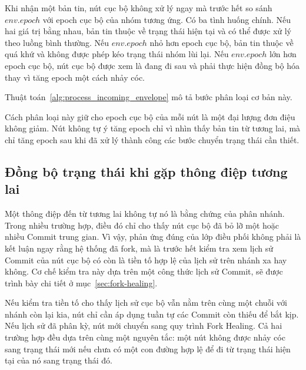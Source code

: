 \documentclass[../DoAn.tex]{subfiles}
\begin{document}
Khi nhận một bản tin, nút cục bộ không xử lý ngay mà trước hết so sánh $env.epoch$ với epoch cục bộ của nhóm tương ứng. Có ba tình huống chính. Nếu hai giá trị bằng nhau, bản tin thuộc về trạng thái hiện tại và có thể được xử lý theo luồng bình thường. Nếu $env.epoch$ nhỏ hơn epoch cục bộ, bản tin thuộc về quá khứ và không được phép kéo trạng thái nhóm lùi lại. Nếu $env.epoch$ lớn hơn epoch cục bộ, nút cục bộ được xem là đang đi sau và phải thực hiện đồng bộ hóa thay vì tăng epoch một cách nhảy cóc.

Thuật toán~\ref{alg:process_incoming_envelope} mô tả bước phân loại cơ bản này.

\begin{algorithm}[htbp]
\SetAlgoLined
{}
\BlankLine
{}
\caption{Phân loại bản tin theo epoch ($ProcessIncomingEnvelope$)}
\label{alg:process_incoming_envelope}
\end{algorithm}

Cách phân loại này giữ cho epoch cục bộ của mỗi nút là một đại lượng đơn điệu không giảm. Nút không tự ý tăng epoch chỉ vì nhìn thấy bản tin từ tương lai, mà chỉ tăng epoch sau khi đã xử lý thành công các bước chuyển trạng thái cần thiết.

\subsection{Đồng bộ trạng thái khi gặp thông điệp tương lai}

Một thông điệp đến từ tương lai không tự nó là bằng chứng của phân nhánh. Trong nhiều trường hợp, điều đó chỉ cho thấy nút cục bộ đã bỏ lỡ một hoặc nhiều Commit trung gian. Vì vậy, phản ứng đúng của lớp điều phối không phải là kết luận ngay rằng hệ thống đã fork, mà là trước hết kiểm tra xem lịch sử Commit của nút cục bộ có còn là tiền tố hợp lệ của lịch sử trên nhánh xa hay không. Cơ chế kiểm tra này dựa trên một công thức lịch sử Commit, sẽ được trình bày chi tiết ở mục~\ref{sec:fork-healing}.

Nếu kiểm tra tiền tố cho thấy lịch sử cục bộ vẫn nằm trên cùng một chuỗi với nhánh còn lại kia, nút chỉ cần áp dụng tuần tự các Commit còn thiếu để bắt kịp. Nếu lịch sử đã phân kỳ, nút mới chuyển sang quy trình Fork Healing. Cả hai trường hợp đều dựa trên cùng một nguyên tắc: một nút không được nhảy cóc sang trạng thái mới nếu chưa có một con đường hợp lệ để đi từ trạng thái hiện tại của nó sang trạng thái đó.
\end{document}
